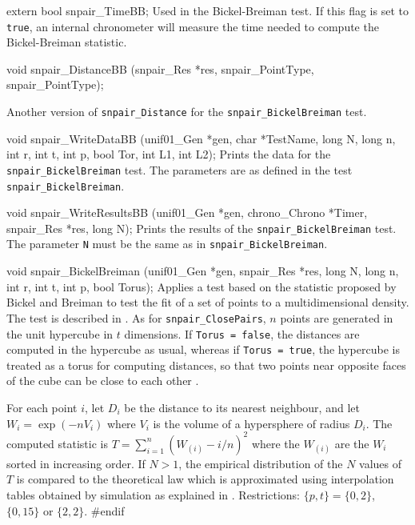 \ifdetailed  %


\fi  %
\hide %
\code

extern bool snpair_TimeBB;
\endcode
 \tab Used in the Bickel-Breiman test. If this flag is set to {\tt true},
   an internal chronometer will measure the time needed to
   compute the Bickel-Breiman statistic.
 \endtab
\code


void snpair_DistanceBB (snpair_Res *res, snpair_PointType, snpair_PointType);

\endcode
 \tab Another version of {\tt snpair\_Distance} for the
  {\tt snpair\_BickelBreiman} test.
\endtab
\endhide %
\ifdetailed %
\code


void snpair_WriteDataBB (unif01_Gen *gen, char *TestName, long N, long n,
                         int r, int t, int p, bool Tor, int L1, int L2);
\endcode
 \tab Prints the data for the {\tt snpair\_BickelBreiman} test. The parameters
  are as defined in the test {\tt snpair\_BickelBreiman}.
 \endtab
\code


void snpair_WriteResultsBB (unif01_Gen *gen, chrono_Chrono *Timer,
                            snpair_Res *res, long N);
\endcode
 \tab Prints the results of the {\tt snpair\_BickelBreiman} test.
  The parameter {\tt N} must be the same as in  {\tt snpair\_BickelBreiman}.
 \endtab
\fi  %
\code


void snpair_BickelBreiman (unif01_Gen *gen, snpair_Res *res, long N,
                           long n, int r, int t, int p, bool Torus);
\endcode
\tab
 Applies a test based on the statistic proposed by
 Bickel and Breiman \cite {tBIC83a} to test the fit of a set of
 points to a multidimensional density.
 The test is described in \cite{rLEC00c}.
 As for {\tt snpair\_ClosePairs}, $n$ points are generated in the
 unit hypercube in $t$ dimensions.
 If {\tt Torus = false}, the distances are computed in the hypercube
 as usual, whereas if {\tt Torus = true}, the hypercube is treated as a
 torus for computing distances, so that two points near
 opposite  faces of the cube can be close to each other \cite{rLEC00c}.

 For each point $i$, let $D_i$ be the distance to its nearest neighbour,
 and let $W_i = \exp(-nV_i)$ where $V_i$ is the volume of a hypersphere of
 radius $D_i$.  The computed statistic is
 $T = \sum_{i=1}^{n}(W_{(i)} - {i / n})^2$
 where the $W_{(i)}$ are the $W_i$ sorted in increasing order.
 If $N>1$, the empirical distribution of the $N$ values of $T$
 is compared to the theoretical law which is approximated using
 interpolation tables obtained by simulation as explained in \cite{rLEC00c}.
 Restrictions: $\{p, t\} = \{0, 2\}$,  $\{0, 15\}$ or $\{2, 2\}$.
 \endtab
\hide  %
\code
#endif
\endcode
\endhide
